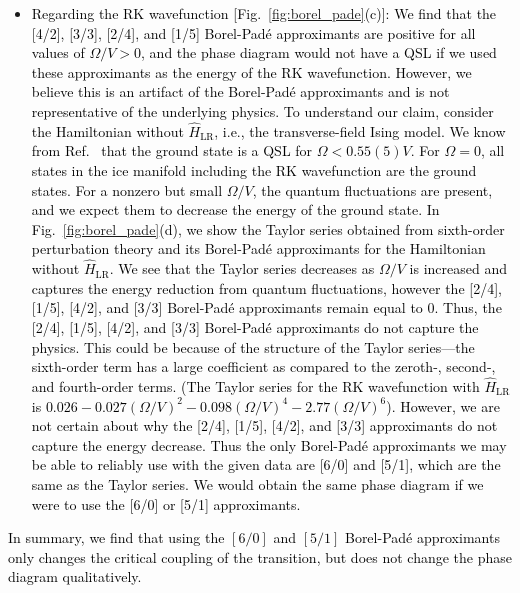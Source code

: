 \documentclass[twocolumn,superscriptaddress,amsmath,amssymb,aps,prx,nofootinbib]{revtex4-2}
\newcommand{\newtext}[1]{\textcolor{black}{#1}}
\begin{document}
\begin{itemize}
    \item \newtext{Regarding the RK wavefunction [Fig.~\ref{fig:borel_pade}(c)]: We find that the [4/2], [3/3], [2/4], and [1/5] Borel-Pad\'e approximants are positive for all values of $\Omega/V > 0$, and the phase diagram would not have a QSL if we used these approximants as the energy of the RK wavefunction. 
    However, we believe this is an artifact of the Borel-Pad\'e approximants and is not representative of the underlying physics. To understand our claim, consider the Hamiltonian without $\hat{H}_{\text{LR}}$, i.e., the transverse-field Ising model. We know from Ref.~\cite{emonts2018monte} that the ground state is a QSL for $\Omega < 0.55(5) V$. For $\Omega =0$, all states in the ice manifold including the RK wavefunction are the ground states. 
    For a nonzero but small $\Omega/V$, the quantum fluctuations are present, and we expect them to decrease the energy of the ground state. In 
    Fig.~\ref{fig:borel_pade}(d), we show the Taylor series obtained from sixth-order perturbation theory and its Borel-Pad\'e approximants for the Hamiltonian without $\hat{H}_{\text{LR}}$. 
    We see that the Taylor series decreases as $\Omega/V$ is increased and captures the energy reduction from quantum fluctuations, however the [2/4], [1/5], [4/2], and [3/3] Borel-Pad\'e approximants remain equal to 0.
    Thus, the [2/4], [1/5], [4/2], and [3/3] Borel-Pad\'e approximants do not capture the physics. This could be because of the structure of the Taylor series---the sixth-order term has a large coefficient as compared to the zeroth-, second-, and fourth-order terms. (The Taylor series for the RK wavefunction with $\hat{H}_{\text{LR}}$ is $0.026 - 0.027 (\Omega/V)^2 - 0.098 (\Omega/V)^4 - 2.77 (\Omega/V)^6$). However, we are not certain about why the [2/4], [1/5], [4/2], and [3/3] approximants do not capture the energy decrease.
    Thus the only Borel-Pad\'e approximants we may be able to reliably use with the given data are [6/0] and [5/1], which are the same as the Taylor series. We would obtain the same phase diagram if we were to use the [6/0] or [5/1] approximants.}
\end{itemize}
\newtext{In summary, we find that using the $[6/0]$ and $[5/1]$ Borel-Pad\'e approximants only changes the critical coupling of the transition, but does not change the phase diagram qualitatively.}
\end{document}
